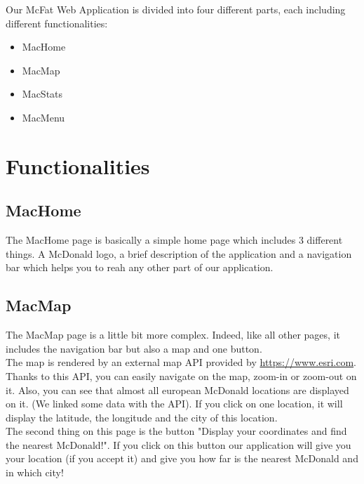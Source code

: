 \documentclass[12pt]{article}
\begin{document}
    \noindent Our McFat Web Application is divided into four different parts, each including different functionalities:
    \begin{itemize}
        \item MacHome
        \item MacMap
        \item MacStats
        \item MacMenu
    \end{itemize} 

    {\color{color_section}\section{Functionalities}}

        {\color{color_subsection}\subsection{MacHome}}
        \noindent The MacHome page is basically a simple home page which includes 3
        different things. A McDonald logo, a brief description of the
        application and a navigation bar which helps you to reah any other
        part of our application.\\

        {\color{color_subsection}\subsection{MacMap}}
        \noindent The MacMap page is a little bit more complex. Indeed, like
        all other pages, it includes the navigation bar but also a map and one
        button.\\

        \noindent The map is rendered by an external map API provided by 
        \url{https://www.esri.com}. Thanks to this API, you can easily
        navigate on the map, zoom-in or zoom-out on it. Also, you can see 
        that almost all european McDonald locations are displayed on it.
        (We linked some data with the API). If you click on one location,
        it will display the latitude, the longitude and the city of this
        location.\\

        \noindent The second thing on this page is the button "Display your
        coordinates and find the nearest McDonald!". If you click on this button
        our application will give you your location (if you accept it) and give
        you how far is the nearest McDonald and in which city!
\end{document}
